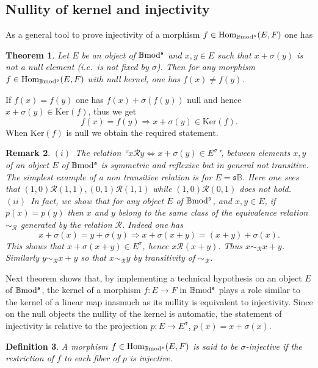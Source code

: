 \documentclass[12pt]{article}
\newtheorem{thm}{Theorem}[section]
\newtheorem{defn}[thm]{Definition}
\newtheorem{rem}[thm]{Remark}
\def\Hom{{\rm Hom}}
\def\B{{\mathbb B}}
\def\cR{{\mathcal R}}
\newcommand{\ie}{{\it i.e.\/}\ }
\def\ker{{\mbox{Ker}}}
\def\Hom {{\mbox{Hom}}}
\def\yb{\mathfrak{s}}
\def\b2{{\rm \B mod^{\mathfrak s}}}
\begin{document}
      \subsection{Nullity of kernel and injectivity}\label{section kernel and injective}
 
 
 As a general tool to prove injectivity of a morphism $f\in \Hom_\b2(E,F)$ one has
\begin{thm}\label{kernel and injective strong} Let $E$ be an object of $\b2$ and $x,y\in E$ such that  $x+\sigma(y)$ is not a null element (\ie is not fixed by $\sigma$). Then for any morphism $f\in \Hom_\b2(E,F)$ with null kernel, one has $f(x)\neq f(y)$.
\end{thm}
\proof If $f(x)=f(y)$ one has $f(x)+\sigma(f(y))$ null and hence $x+\sigma(y)\in \ker(f)$, thus we get
\begin{equation}\label{kernel significance}
	f(x)=f(y)\Rightarrow x+\sigma(y)\in \ker(f).
\end{equation}
When $\ker(f)$ is null we obtain the required statement. \endproof 
\begin{rem}\label{relation equiv} $(i)$~The relation ``$x \cR y\iff x+\sigma(y)\in E^\sigma$", between elements $x,y$ of an object $E$ of $\b2$ is symmetric and reflexive but in general not transitive. The simplest example of a non transitive relation is for $E=\yb\B$. Here one sees that
$
(1,0)\cR(1,1), (0,1)\cR (1,1)
$ while $(1,0)\cR(0,1)$ does not hold.\newline
$(ii)$~In fact, we show that for any object $E$ of $\b2$, and $x,y\in E$, if $p(x)=p(y)$ then $x$ and $y$ belong to the same class of the equivalence relation $\sim_\cR$ generated by the relation $\cR$. Indeed one has 
$$
x+\sigma(x)=y+\sigma(y)\Rightarrow x+\sigma(x+y)=(x+y)+\sigma(x).
$$
This shows that $x+\sigma(x+y)\in E^\sigma$, hence $x\cR(x+y)$.  Thus $x\sim_\cR x+y$. Similarly $y\sim_\cR x+y$ so that $x\sim_\cR y$ by transitivity of $\sim_\cR$.	
\end{rem}
   Next theorem shows that, by implementing a technical hypothesis on an object $E$ of $\b2$, the kernel of a morphism $f:E\to F$ in $\b2$ plays a role similar to the kernel of a linear map inasmuch as its nullity is equivalent to injectivity. Since on the null objects the nullity of the kernel is automatic, the statement of injectivity is relative to the projection $p:E\to E^\sigma$, $p(x)=x+\sigma(x)$. 
   \begin{defn}\label{sigma inject} A morphism $f\in \Hom_\b2(E,F)$ is said to be $\sigma$-{\em injective} if the restriction of $f$ to each fiber of $p$ is injective.	
\end{defn}
\end{document}
